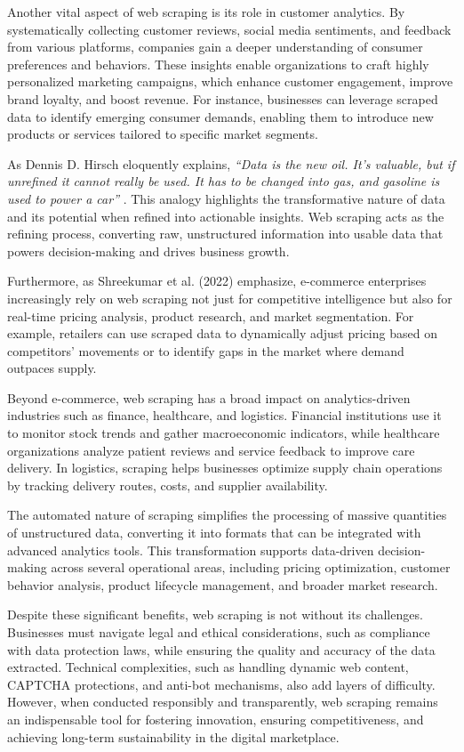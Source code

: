 Another vital aspect of web scraping is its role in customer analytics. By systematically collecting customer reviews, social media sentiments, and feedback from various platforms, companies gain a deeper understanding of consumer preferences and behaviors. These insights enable organizations to craft highly personalized marketing campaigns, which enhance customer engagement, improve brand loyalty, and boost revenue. For instance, businesses can leverage scraped data to identify emerging consumer demands, enabling them to introduce new products or services tailored to specific market segments.

As Dennis D. Hirsch eloquently explains, \textit{“Data is the new oil. It's valuable, but if unrefined it cannot really be used. It has to be changed into gas, and gasoline is used to power a car”} \cite{hirsch2014}. This analogy highlights the transformative nature of data and its potential when refined into actionable insights. Web scraping acts as the refining process, converting raw, unstructured information into usable data that powers decision-making and drives business growth.

Furthermore, as Shreekumar et al. (2022) emphasize, e-commerce enterprises increasingly rely on web scraping not just for competitive intelligence but also for real-time pricing analysis, product research, and market segmentation. For example, retailers can use scraped data to dynamically adjust pricing based on competitors’ movements or to identify gaps in the market where demand outpaces supply. 

Beyond e-commerce, web scraping has a broad impact on analytics-driven industries such as finance, healthcare, and logistics. Financial institutions use it to monitor stock trends and gather macroeconomic indicators, while healthcare organizations analyze patient reviews and service feedback to improve care delivery. In logistics, scraping helps businesses optimize supply chain operations by tracking delivery routes, costs, and supplier availability.

The automated nature of scraping simplifies the processing of massive quantities of unstructured data, converting it into formats that can be integrated with advanced analytics tools. This transformation supports data-driven decision-making across several operational areas, including pricing optimization, customer behavior analysis, product lifecycle management, and broader market research.

Despite these significant benefits, web scraping is not without its challenges. Businesses must navigate legal and ethical considerations, such as compliance with data protection laws, while ensuring the quality and accuracy of the data extracted. Technical complexities, such as handling dynamic web content, CAPTCHA protections, and anti-bot mechanisms, also add layers of difficulty. However, when conducted responsibly and transparently, web scraping remains an indispensable tool for fostering innovation, ensuring competitiveness, and achieving long-term sustainability in the digital marketplace.
